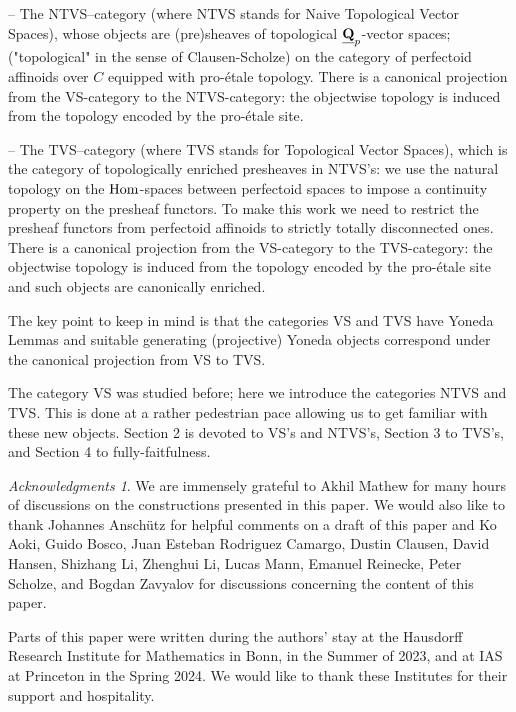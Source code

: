 \documentclass[10pt]{amsart}
\theoremstyle{definition}
\theoremstyle{remark}
\newtheorem*{acknowledgments}{Acknowledgments}
\newcommand{\Hom}{{\rm{Hom}} }
\numberwithin{equation}{section}
\def\Q{{\bf Q}} \def\Z{{\bf Z}}
\numberwithin{equation}{section}
\begin{document}
-- The {\rm NTVS}--category (where {\rm NTVS} stands for Naive Topological Vector Spaces), 
whose objects are (pre)sheaves of topological $\underline{\Q}_p$-vector spaces; ("topological" in the sense of Clausen-Scholze) on the category of perfectoid affinoids over $C$ equipped with pro-\'etale topology. There is a canonical projection from the {\rm VS}-category to the {\rm NTVS}-category: the objectwise topology is induced from the topology 
encoded by  the pro-\'etale site.

-- The {\rm TVS}--category (where {\rm TVS} stands for Topological Vector Spaces), which is the  category of topologically enriched 
 presheaves in  {\rm NTVS}'s: we use  the natural topology on the $\Hom$-spaces between perfectoid spaces to impose a continuity property on the presheaf functors. To make this work we need to restrict the presheaf functors from perfectoid affinoids to strictly totally disconnected ones. There is a canonical projection from the {\rm VS}-category to the {\rm TVS}-category: the objectwise topology is induced from the topology 
encoded by  the pro-\'etale site and such objects are canonically enriched.

  The key point to keep in mind is that the categories {\rm VS}  and {\rm TVS} have  Yoneda Lemmas and suitable  generating (projective) Yoneda objects correspond under the canonical projection from {\rm VS} to {\rm TVS}. 
  
  The category {\rm VS} was studied before; here we introduce the categories {\rm NTVS} and {\rm TVS}. This is done at a rather pedestrian pace allowing us to get familiar with these new objects. Section 2 is devoted to {\rm VS}'s and {NTVS}'s, Section 3 to {\rm TVS}'s, and Section 4 to fully-faitfulness.

\begin{acknowledgments}  We are  immensely  grateful to Akhil Mathew for many hours of discussions on the  constructions presented in this paper. 
 We would also like to thank 
Johannes Ansch\"utz for helpful comments on a draft of this paper and  Ko Aoki, Guido Bosco, Juan Esteban Rodriguez Camargo,  Dustin Clausen, David Hansen, Shizhang Li, Zhenghui Li,  Lucas Mann,  Emanuel Reinecke, Peter Scholze, and Bogdan Zavyalov for  discussions concerning the content of this paper. 

Parts of this paper were written during the  authors' stay at the Hausdorff Research Institute for Mathematics in Bonn, in the Summer of 2023, and at IAS at Princeton in the Spring 2024. We would like to thank these Institutes for their support and hospitality. 
\end{acknowledgments}
\end{document}
